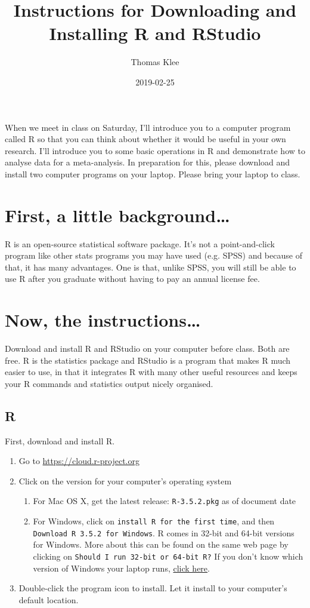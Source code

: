 \documentclass[10pt, a4paper]{article}   	%
\title{Instructions for Downloading and Installing R and RStudio}
\author{Thomas Klee}
\date{2019-02-25}							%
\begin{document}
\maketitle

When we meet in class on Saturday, I'll introduce you to a computer program called R so that you can think about whether it would be useful in your own research. I'll introduce you to some basic operations in R and demonstrate how to analyse data for a meta-analysis. In preparation for this, please download and install two computer programs on your laptop. Please bring your laptop to class. 

\section*{First, a little background\dots}

R is an open-source statistical software package. It's not a point-and-click program like other stats programs you may have used (e.g. SPSS) and because of that, it has many advantages. One is that, unlike SPSS, you will still be able to use R after you graduate without having to pay an annual license fee.

\section*{Now, the instructions\dots}

Download and install R and RStudio on your computer before class. Both are free. R is the statistics package and RStudio is a program that makes R much easier to use, in that it integrates R with many other useful resources and keeps your R commands and statistics output nicely organised.

\subsection*{R}
First, download and install R. 

\begin{enumerate}
	\item Go to \url{https://cloud.r-project.org} 
	\item Click on the version for your computer's operating system
		\begin{enumerate}
			\item For Mac OS X, get the latest release: \texttt{R-3.5.2.pkg} as of document date 
			\item For Windows, click on \texttt{install R for the first time}, and then \texttt{Download R 3.5.2 for Windows}. R comes in 32-bit and 64-bit versions for Windows. More about this can be found on the same web page by clicking on \texttt{Should I run 32-bit or 64-bit R?} If you don't know which version of Windows your laptop runs, {\href{https://support.microsoft.com/en-hk/help/827218/how-to-determine-whether-a-computer-is-running-a-32-bit-version-or-64}{click here}}. 
		\end{enumerate}
	\item Double-click the program icon to install. Let it install to your computer's default location.
\end{enumerate}
\end{document}
